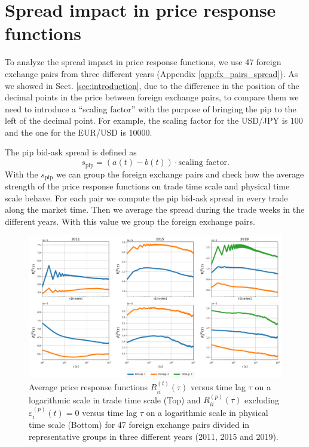 \section{Spread impact in price response functions}\label{sec:spread_impact}

To analyze the spread impact in price response functions, we use 47 foreign
exchange pairs from three different years (Appendix \ref{app:fx_pairs_spread}).
As we showed in Sect. \ref{sec:introduction}, due to the difference in the
position of the decimal points in the price between foreign exchange pairs, to
compare them we need to introduce a ``scaling factor'' with the purpose of
bringing the pip to the left of the decimal point. For example, the scaling
factor for the USD/JPY is $100$ and the one for the EUR/USD is $10000$.

The pip bid-ask spread is defined as \cite{micro_eff}
\begin{equation}
    s_{\textrm{pip}} = \left(a\left(t\right) - b\left(t\right)\right) \cdot
    \textrm{scaling factor}.
\end{equation}
With the $s_{\textrm{pip}}$ we can group the foreign exchange pairs and check
how the average strength of the price response functions on trade time scale
and physical time scale behave. For each pair we compute the pip bid-ask spread
in every trade along the market time. Then we average the spread during the
trade weeks in the different years. With this value we group the foreign
exchange pairs.

\begin{figure}[htbp]
    \centering
    \includegraphics[width=\textwidth]{figures/05_spread_impact.png}
    \caption{Average price response functions
             $R^{\left(t\right)}_{ii}\left(\tau\right)$ versus time lag $\tau$
             on a logarithmic scale in trade time scale (Top) and
             $R^{\left(p\right)}_{ii}\left(\tau\right)$ excluding
             $\varepsilon^{\left(p\right)}_{i}\left(t\right) = 0$ versus time
             lag $\tau$ on a logarithmic scale in physical time scale (Bottom)
             for 47 foreign exchange pairs divided in representative groups in
             three different years (2011, 2015 and 2019).}
    \label{fig:spread_impact}
\end{figure}

